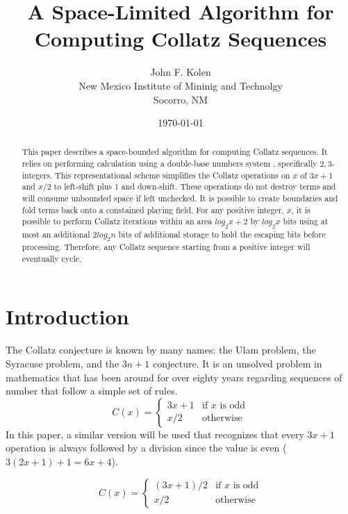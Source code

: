 \documentclass{article}
\title{A Space-Limited Algorithm for Computing Collatz Sequences}
\author{John F. Kolen\\
  New Mexico Institute of Mininig and Technolgy \\
  Socorro, NM
  }
\date{\today}
\begin{document}
\maketitle


\begin{abstract}
  This paper describes a space-bounded algorithm for computing Collatz
  sequences.  It relies on performing calculation using a double-base numbers
  system \cite{dimitrov2017}, specifically ${2,3}$-integers. This
  representational scheme simplifies the Collatz operations on $x$ of $3x+1$
  and $x/2$ to left-shift plus 1 and down-shift. These operations do not
  destroy terms and will consume unbounded space if left unchecked. It is
  possible to create boundaries and fold terms back onto a constained playing
  field. For any positive integer, $x$, it is possible to perform Collatz
  iterations within an area $log_2x+2$ by $log_2x$ bits using at most an
  additional $2log_2n$ bits of additional storage to hold the escaping bits
  before processing. Therefore, any Collatz sequence starting from a positive
  integer will eventually cycle.
\end{abstract}

\section{Introduction}

The Collatz conjecture is known by many names: the Ulam problem, the Syracuse
problem, and the $3n+1$ conjecture.  It is an unsolved problem in mathematics
that has been around for over eighty years regarding sequences of number that
follow a simple set of rules.
\begin{equation}
  C(x) = \begin{cases}
    3 x + 1 & \text{if } x \text{ is odd}\\
    x / 2 & \text{otherwise}
    \end{cases}
\end{equation}
In this paper, a similar version will be used that recognizes that every $3x+1$
operation is always followed by a division since the value is even ($3(2x+1) + 1=6x + 4$).

\begin{equation}
  C(x) = \begin{cases}
    (3 x + 1) / 2 & \text{if } x \text{ is odd}\\
    x / 2 & \text{otherwise}
    \end{cases}
\end{equation}
\end{document}
